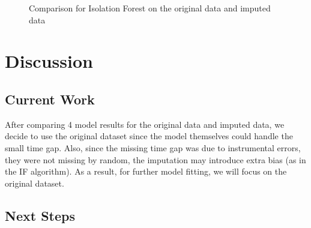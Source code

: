 \documentclass[
]{article}
\begin{document}
\begin{figure}[H]

{\centering {}

}

\caption{Comparison for Isolation Forest on the original data and imputed data}\label{fig:comp}
\end{figure}

\section{Discussion}\label{discussion}

\subsection{Current Work}\label{current-work}

After comparing 4 model results for the original data and imputed data, we decide to use the original dataset since the model themselves could handle the small time gap. Also, since the missing time gap was due to instrumental errors, they were not missing by random, the imputation may introduce extra bias (as in the IF algorithm). As a result, for further model fitting, we will focus on the original dataset.

\subsection{Next Steps}\label{next-steps}
\end{document}
